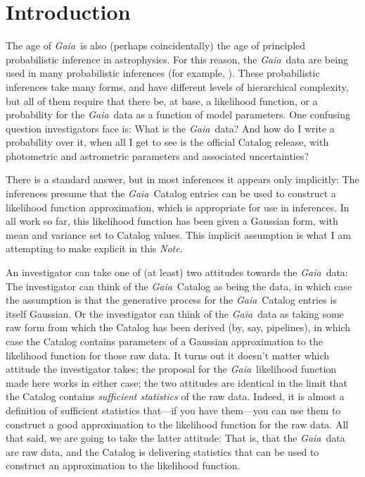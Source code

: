 \documentclass[12pt, modern]{aastex62}
\newcommand{\Gaia}{\textsl{Gaia}}
\newcommand{\documentname}{\textsl{Note}}
\begin{document}
\section{Introduction}
The age of \Gaia\ is also (perhaps coincidentally) the age of principled
probabilistic inference in astrophysics.
For this reason, the \Gaia\ data are being used in many probabilistic
inferences (for example, \citealt{tri3, hawkins, sesar}).
These probabilistic inferences take many forms, and have different levels
of hierarchical complexity, but all of them require that there be, at base,
a likelihood function, or a probability for the \Gaia\ data as a function
of model parameters.
One confusing question investigators face is: What is the \Gaia\ data?
And how do I write a probability over it, when all I get to see is the
official Catalog release, with photometric and astrometric parameters and associated
uncertainties?

There is a standard answer, but in most inferences it appears only implicitly:
The inferences presume that the \Gaia\ Catalog entries can be used to construct
a likelihood function approximation, which is appropriate for use in inferences.
In all work so far, this likelihood function has been given a Gaussian form,
with mean and variance set to Catalog values.
This implicit assumption is what I am attempting to make explicit in this \documentname.

An investigator can take one of (at least) two attitudes towards the \Gaia\ data:
The investigator can think of the \Gaia\ Catalog as being the data, in which case
the assumption is that the generative process for the \Gaia\ Catalog entries is
itself Gaussian.
Or the investigator can think of the \Gaia\ data as taking some raw form
from which the Catalog has been derived (by, say, pipelines),
in which case the Catalog contains parameters of a Gaussian
approximation to the likelihood function for those raw data.
It turns out it doesn't matter which attitude the investigator takes; the
proposal for the \Gaia\ likelihood function made here works in either case;
the two attitudes are identical in the limit that the Catalog contains
\emph{sufficient statistics} of the raw data.
Indeed, it is almost a definition of sufficient statistics that---if you have them---you
can use them to construct a good approximation to the likelihood function for the
raw data.
All that said, we are going to take the latter attitude: That is, that the
\Gaia\ data are raw data, and the Catalog is delivering statistics that can
be used to construct an approximation to the likelihood function.
\end{document}
